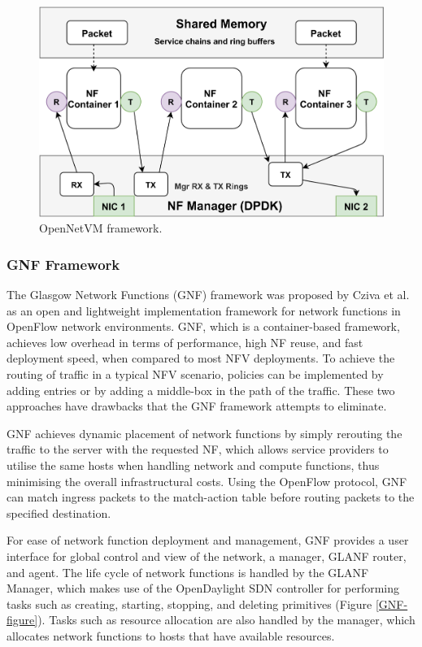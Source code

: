 \documentclass[futureinternet,review,accept,pdftex,moreauthors]{Definitions/mdpi}
\begin{document}
\begin{figure}[H]%
\includegraphics[width=0.85\columnwidth]{OpenNetVm.pdf}
\caption{OpenNetVM framework.}
\label{OpenNetVM-Figure}
\end{figure}





\subsubsection{GNF Framework}
\label{GNF}
The Glasgow Network Functions (GNF) framework was proposed by Cziva {et al.}~\cite{cziva2015container} as an open and lightweight implementation framework for network functions in OpenFlow network environments. GNF, which is a container-based framework, achieves low overhead in terms of performance, high NF reuse, and fast deployment speed, when compared to most NFV deployments. To achieve the routing of traffic in a typical NFV scenario, policies can be implemented by adding entries or by adding a middle-box in the path of the traffic. These two approaches have drawbacks that the GNF framework attempts to eliminate.

GNF achieves dynamic placement of network functions by simply rerouting the traffic to the server with the requested NF, which allows service providers to utilise the same hosts when handling network and compute functions, thus minimising the overall infrastructural costs. Using the OpenFlow protocol, GNF can match ingress packets to the match-action table before routing packets to the specified destination. 

For ease of network function deployment and management, GNF provides a user interface for global control and view of the network, a manager, GLANF router, and agent. The life cycle of network functions is handled by the GLANF Manager, which makes use of the OpenDaylight SDN controller for performing tasks such as creating, starting, stopping, and deleting primitives (Figure \ref{GNF-figure}). Tasks such as resource allocation are also handled by the manager, which allocates network functions to hosts that have available resources. 
\end{document}
